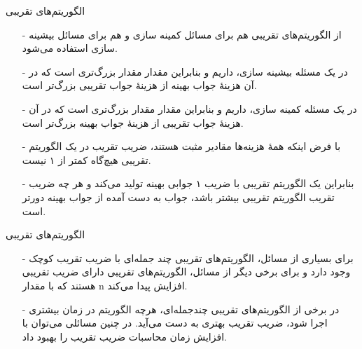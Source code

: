 \begin{frame}{‌الگوریتم‌های تقریبی}
\begin{itemize}\itemr
\item[-]
از الگوریتم‌های تقریبی
هم برای مسائل کمینه سازی و هم برای مسائل بیشینه سازی استفاده می‌شود.
\item[-]
در یک مسئله بیشینه سازی، داریم
و بنابراین مقدار
مقدار بزرگ‌تری است که در آن هزینهٔ جواب بهینه از هزینهٔ جواب تقریبی بزرگ‌تر است.
\item[-]
در یک مسئله کمینه سازی، داریم
و بنابراین مقدار
مقدار بزرگ‌تری است که در آن هزینهٔ جواب تقریبی از هزینهٔ جواب بهینه بزرگ‌تر است.
\item[-]
با فرض اینکه همهٔ هزینه‌ها مقادیر مثبت هستند، ضریب تقریب در یک الگوریتم تقریبی هیچ‌گاه کمتر از ۱ نیست.
\iffalse
 زیرا اگر داشته باشیم
\m{C/C^* \leqslant 1}
آنگاه
\m{C^*/C \geqslant 1}
.
\fi
\item[-]
بنابراین یک الگوریتم تقریبی با ضریب ۱ جوابی بهینه تولید می‌کند و هر چه ضریب تقریب الگوریتم تقریبی بیشتر باشد، جواب به دست آمده از جواب بهینه دورتر است.
\end{itemize}
\end{frame}


\begin{frame}{‌الگوریتم‌های تقریبی}
\begin{itemize}\itemr
\item[-]
برای بسیاری از مسائل، الگوریتم‌های تقریبی چند جمله‌ای با ضریب تقریب کوچک وجود دارد و برای برخی دیگر از مسائل، الگوریتم‌های تقریبی دارای ضریب تقریبی هستند که با مقدار n افزایش پیدا می‌کند.
\item[-]
در برخی از الگوریتم‌های تقریبی چندجمله‌ای، هرچه الگوریتم در زمان بیشتری اجرا شود، ضریب تقریب بهتری به دست می‌آید. در چنین مسائلی می‌توان با افزایش زمان محاسبات ضریب تقریب را بهبود داد.
\end{itemize}
\end{frame}